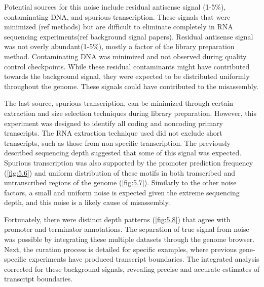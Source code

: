 Potential sources for this noise include residual antisense signal (1-5\%), contaminating DNA, and spurious transcription. These signals that were minimized (ref methods) but are difficult to eliminate completely in RNA sequencing experiments(ref background signal papers). Residual antisense signal was not overly abundant(1-5\%), mostly a factor of the library preparation method.\cite{18} Contaminating DNA was minimized and not observed during quality control checkpoints. While these residual contaminants might have contributed towards the background signal, they were expected to be distributed uniformly throughout the genome. These signals could have contributed to the misassembly.

The last source, spurious transcription, can be minimized through certain extraction and size selection techniques during library preparation. However, this experiment was designed to identify all coding and noncoding primary transcripts. The RNA extraction technique used did not exclude short transcripts, such as those from non-specific transcription. The previously described sequencing depth suggested that some of this signal was expected.\cite{110,176,163,164} Spurious transcription was also supported by the promoter prediction frequency (\ref{fig:5.6}) and uniform distribution of these motifs in both transcribed and untranscribed regions of the genome (\ref{fig:5.7}). Similarly to the other noise factors, a small and uniform noise is expected given the extreme sequencing depth, and this noise is a likely cause of misassembly.

Fortunately, there were distinct depth patterns (\ref{fig:5.8}) that agree with promoter and terminator annotations. The separation of true signal from noise was possible by integrating these multiple datasets through the genome browser. Next, the curation process is detailed for specific examples, where previous gene-specific experiments have produced transcript boundaries. The integrated analysis corrected for these background signals, revealing precise and accurate estimates of transcript boundaries. 



